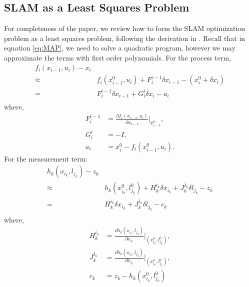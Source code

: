 \appendix
\subsection{SLAM as a Least Squares Problem}
\label{appendix:leastsquare}
For completeness of the paper, we review how to form the SLAM optimization problem as a least squares problem, following the derivation in \cite{isam}. Recall that in equation \ref{eq:MAP}, we need to solve a quadratic program, however we may approximate the terms with first order polynomials. For the process term,
\begin{equation}
\begin{aligned}
f_i(x_{i-1}, u_i) - x_i\\
\approx & {f_i(x_{i-1}^0, u_i)} + F_i^{i-1}\delta x_{i-1} - (x_i^0 + \delta x_i)\\
=& F_i^{i-1}\delta x_{i-1} + G_i^i\delta x_i - a_i \\
\end{aligned}
\label{eq:linearProcessTerm}
\end{equation}
where, 
\begin{equation*}
\begin{aligned}
F_i^{i-1} &= \frac{\partial f_i(x_{i-1}, u_i)}{\partial x_{i-1}}|_{x_{i-1}^0}, \label{F} \\%
 G_i^i &= -I, \\%
a_i &= x_i^0 - f_i(x_{i-1}^0, u_i).
\end{aligned}
\end{equation*}
For the measurement term:
\begin{equation}
\begin{aligned}
h_k(x_{i_k}, l_{j_k}) - z_k\\
\approx & {h_k(x_{i_k}^0, l_{j_k}^0) + H_k^{i_k}\delta x_{i_k} + J_k^{j_k}\delta l_{j_k}} - z_k\\
= & {H_k^{i_k}\delta x_{i_k} + J_k^{j_k}\delta l_{j_k}} - c_k\\
\end{aligned}
\label{eq:linearMeasurementTerm}
\end{equation}
where, 
\begin{equation*}
\begin{aligned}
H_k^{i_k} &= \frac{\partial h_k(x_{i_k}, l_{j_k})}{\partial x_{i_k}}|_{(x_{i_k}^0, l_{j_k}^0)}, \\ 
J_k^{j_k} &= \frac{\partial h_k(x_{i_k}, l_{j_k})}{\partial x_{i_k}}|_{(x_{i_k}^0, l_{j_k}^0)} , \\
 c_k &= z_k - h_k(x_{i_k}^0, l_{j_k}^0)
\end{aligned}
\end{equation*}
